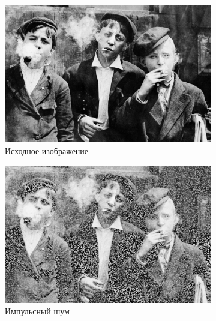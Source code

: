  \begin{figure}[ht!] 
    \centering
    \begin{subfigure}[b]{0.5\linewidth}
        \centering
        \includegraphics[width=0.95\linewidth]{../lewis-hine-taschen-main-3.jpg} 
        \caption{Исходное изображение} 
        \label{contraharmonic_0.85:a} 
        \vspace{4ex}
    \end{subfigure}%
    \begin{subfigure}[b]{0.5\linewidth}
      \centering
      \includegraphics[width=0.95\linewidth]{../Contraharmonic_Filter/Contraharmonic_Impulse_noise_(m,n=(3,_3),q=0.85).jpg} 
      \caption{Импульсный шум} 
      \label{contraharmonic_0.85:b} 
      \vspace{4ex}
    \end{subfigure}
    \begin{subfigure}[b]{0.5\linewidth}
      \centering

\end{subfigure}
\end{figure}
